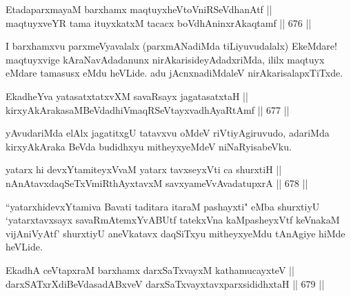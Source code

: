 
\begin{shl}
EtadaparxmayaM barxhamx maqtuyxheVtoVniRSeVdhanAtf || \\
maqtuyxveYR tama ituyxkatxM tacacx boVdhAninxrAkaqtamf \hfill || 676 ||  
\end{shl}

\begin{artha} 
I barxhamxvu parxmeVyavalalx (parxmANadiMda tiLiyuvudalalx) EkeMdare! maqtuyxvige kAraNavAdadanunx nirAkarisideyAdadxriMda, ililx maqtuyx eMdare tamasusx eMdu heVLide. adu jAcnxnadiMdaleV nirAkarisalapxTiTxde.
\end{artha}


\begin{shl}
EkadheYva yatasatxtatxvXM savaRsayx jagatasatxtaH || \\
kirxyAkArakasaMBeVdadhiVmaqRSeVtayxvadhAyaRtAmf \hfill || 677 ||  
\end{shl}

\begin{artha} 
yAvudariMda elAlx jagatitxgU tatavxvu oMdeV riVtiyAgiruvudo, adariMda 
kirxyAkAraka BeVda budidhxyu mitheyxyeMdeV niNaRyisabeVku.
\end{artha}


\begin{shl}
yatarx hi devxYtamiteyxVvaM yatarx tavxseyxVti ca shurxtiH || \\
nAnAtavxdaqSeTxVmiRthAyxtavxM savxyameVvAvadatupxrA \hfill || 678 ||  
\end{shl}

\begin{artha} 
``yatarxhidevxYtamiva Bavati taditara itaraM pashayxti" eMba shurxtiyU `yatarxtavxsayx savaRmAtemxYvABUtf tatekxVna kaMpasheyxVtf keVnakaM vijAniVyAtf' shurxtiyU aneVkatavx daqSiTxyu mitheyxyeMdu tAnAgiye hiMde heVLide.
\end{artha}


\begin{shl}
EkadhA ceVtapxraM barxhamx darxSaTxvayxM kathamucayxteV || \\
darxSATxrXdiBeVdasadABxveV darxSaTxvayxtavxparxsididhxtaH \hfill || 679 ||  
\end{shl}

